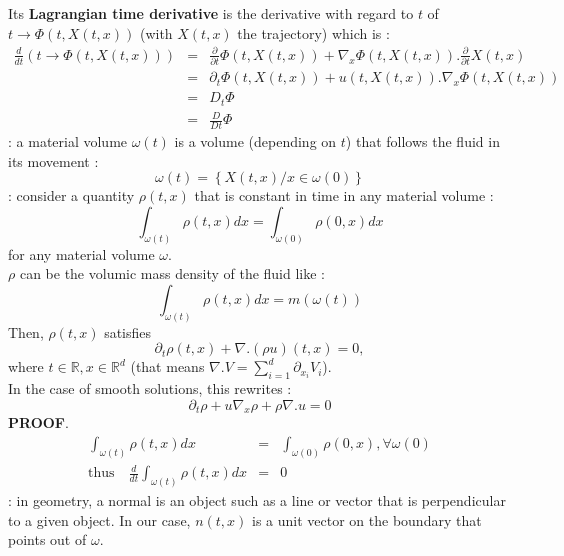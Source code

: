 \documentclass{report}
\newcommand*{\definition}[1]{\noindent\textbf{\color{cadmiumgreen}{#1}}}
\newcommand*{\theorem}[1]{\noindent\textbf{\color{purple}{#1}}}
\theoremstyle{plain}
\theoremstyle{definition}
\theoremstyle{remark}
\begin{document}
Its \textbf{Lagrangian time derivative} is the derivative with regard to $t$ of $t \rightarrow \Phi(t,X(t,x))$ (with $X(t,x)$ the trajectory) which is :
\begin{eqnarray}
\frac{d}{d t}\left( t \rightarrow  \Phi(t,X(t,x)) \right) &=& \frac{\partial}{\partial t}\Phi(t,X(t,x)) + \nabla_x\Phi(t,X(t,x)).\frac{\partial}{\partial t}X(t,x) \\
&=& \partial_t \Phi(t,X(t,x)) + u(t,X(t,x)).\nabla_x\Phi(t,X(t,x)) \\
&=& D_t \Phi \\ &=& \frac{D}{Dt}\Phi
\end{eqnarray}
\definition{Material volume} : a material volume $\omega(t)$ is a volume (depending on $t$) that follows the fluid in its movement : 
\begin{equation}
\omega(t) = \left\lbrace X(t,x) / x \in \omega(0)\right\rbrace
\end{equation}
\theorem{Property} : consider a quantity $\rho(t,x)$ that is constant in time in any material volume : 
\begin{equation}
\int_{\omega(t)} \rho(t,x) dx = \int_{\omega(0)}\rho(0,x)dx
\end{equation}
for any material volume $\omega$. \\
$\rho$ can be the volumic mass density of the fluid like :
\begin{equation}
\int_{\omega(t)}\rho(t,x)dx = m(\omega(t))
\end{equation}
Then, $\rho(t,x)$ satisfies \begin{equation}
\partial_t \rho(t,x) + \nabla.(\rho u)(t,x) = 0,
\end{equation} where $ t \in \mathbb{R}, x \in \mathbb{R}^d$ (that means $\nabla.V = \sum_{i=1}^d \partial_{x_i}V_i$).\\
In the case of smooth solutions, this rewrites :
\begin{equation}
\partial_t\rho + u\nabla_x\rho + \rho\nabla.u = 0
\end{equation}
\textbf{PROOF}.
\begin{eqnarray*}
\int_{\omega(t)} \rho(t,x) dx &=& \int_{\omega(0)}\rho(0,x), \forall \omega(0) \\
\text{thus} \quad \frac{d}{dt}\int_{\omega(t)} \rho(t,x) dx &=& 0
\end{eqnarray*}
\definition{Normal (geometry)} : in geometry, a normal is an object such as a line or vector that is perpendicular to a given object. In our case, $n(t,x)$ is a unit vector on the boundary that points out of $\omega$. \\
\end{document}
